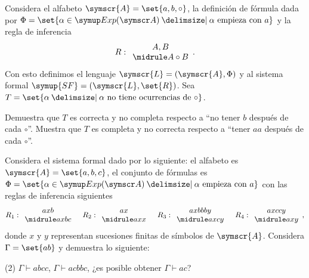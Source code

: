 \documentclass[fc]{tarea}
\newcommand{\al}{\symscr{A}}
\newcommand{\lan}{\symscr{L}}
\newcommand{\sis}{\symup{SF}}
\providecommand\st{}
\newcommand\SetSymbol[1][]{%
\nonscript\:#1\vert
\allowbreak
\nonscript\:
\mathopen{}}
\renewcommand\st{\SetSymbol[\delimsize]}
\begin{document}
\begin{exercise}
  Considera el alfabeto \(\al=\set{a,b,\circ}\), la definición de fórmula dada por \(\Phi=\set{\alpha\in\expr\st\alpha\text{ empieza con }a}\) y la regla de inferencia
  \[
    R:
    \begin{array}{c}
      A,B\\
      \midrule
      A\circ B
    \end{array}.
  \]
  Con esto definimos el lenguaje \(\lan=(\al,\Phi)\) y al sistema formal \(\sis=(\lan,\set{R})\). Sea 
  \(T=\set{\alpha\st\alpha\text{ no tiene ocurrencias de }\circ}\).
  \begin{tasks}
    \task Demuestra que \(T\) es correcta y no completa respecto a \enquote{no tener \(b\) después de cada \(\circ\)}.
    \task Muestra que \(T\) es completa y no correcta respecto a \enquote{tener \(aa\) después de cada \(\circ\)}.
  \end{tasks}
\end{exercise}

\begin{exercise}
  Considera el sistema formal dado por lo siguiente: el alfabeto es
  \(\al=\set{a,b,c}\), el conjunto de fórmulas es 
  \(\Phi=\set{\alpha\in\expr\st\alpha\text{ empieza con } a}\) con las reglas de inferencia siguientes
  \[
    R_1:
    \begin{array}{c}
      axb\\
      \midrule
      axbc
    \end{array}
    \quad
    R_2:
    \begin{array}{c}
      ax\\
      \midrule
      axx
    \end{array}
    \quad
    R_3:
    \begin{array}{c}
      axbbby\\
      \midrule
      axcy
    \end{array}
    \quad
    R_4:
    \begin{array}{c}
      axccy\\
      \midrule
      axy
    \end{array},
  \]
  donde \(x\) y \(y\) representan sucesiones finitas de símbolos de \(\al\). Considera \(\Gamma=\set{ab}\) y demuestra lo siguiente:
  \begin{tasks}(2)
    \task \(\Gamma\vdash abcc\),
    \task \(\Gamma\vdash acbbc\),
    \task ¿es posible obtener \(\Gamma\vdash ac\)?
  \end{tasks}
\end{exercise}
\end{document}

